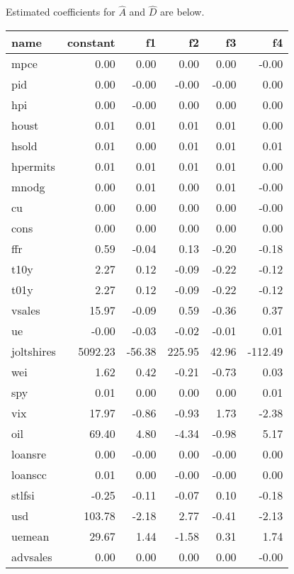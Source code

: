 \documentclass[11pt, letterpaper]{article}\usepackage[]{graphicx}\usepackage[]{color}
\begin{document}
Estimated coefficients for $\widehat{A}$ and $\widehat{D}$ are below.
\begin{table}[H]
\centering
\begingroup\footnotesize
\begin{tabular}{lrrrrr}
  \hline
name & constant & f1 & f2 & f3 & f4 \\ 
  \hline
mpce & 0.00 & 0.00 & 0.00 & 0.00 & -0.00 \\ 
  pid & 0.00 & -0.00 & -0.00 & -0.00 & 0.00 \\ 
  hpi & 0.00 & -0.00 & 0.00 & 0.00 & 0.00 \\ 
  houst & 0.01 & 0.01 & 0.01 & 0.01 & 0.00 \\ 
  hsold & 0.01 & 0.00 & 0.01 & 0.01 & 0.01 \\ 
  hpermits & 0.01 & 0.01 & 0.01 & 0.01 & 0.00 \\ 
  mnodg & 0.00 & 0.01 & 0.00 & 0.01 & -0.00 \\ 
  cu & 0.00 & 0.00 & 0.00 & 0.00 & -0.00 \\ 
  cons & 0.00 & 0.00 & 0.00 & 0.00 & 0.00 \\ 
  ffr & 0.59 & -0.04 & 0.13 & -0.20 & -0.18 \\ 
  t10y & 2.27 & 0.12 & -0.09 & -0.22 & -0.12 \\ 
  t01y & 2.27 & 0.12 & -0.09 & -0.22 & -0.12 \\ 
  vsales & 15.97 & -0.09 & 0.59 & -0.36 & 0.37 \\ 
  ue & -0.00 & -0.03 & -0.02 & -0.01 & 0.01 \\ 
  joltshires & 5092.23 & -56.38 & 225.95 & 42.96 & -112.49 \\ 
  wei & 1.62 & 0.42 & -0.21 & -0.73 & 0.03 \\ 
  spy & 0.01 & 0.00 & 0.00 & 0.00 & 0.01 \\ 
  vix & 17.97 & -0.86 & -0.93 & 1.73 & -2.38 \\ 
  oil & 69.40 & 4.80 & -4.34 & -0.98 & 5.17 \\ 
  loansre & 0.00 & -0.00 & 0.00 & -0.00 & 0.00 \\ 
  loanscc & 0.01 & 0.00 & -0.00 & -0.00 & 0.00 \\ 
  stlfsi & -0.25 & -0.11 & -0.07 & 0.10 & -0.18 \\ 
  usd & 103.78 & -2.18 & 2.77 & -0.41 & -2.13 \\ 
  uemean & 29.67 & 1.44 & -1.58 & 0.31 & 1.74 \\ 
  advsales & 0.00 & 0.00 & 0.00 & 0.00 & -0.00 \\ 

\end{tabular}
\end{table}
\end{document}
